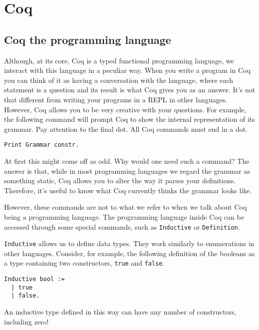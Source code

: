 \chapter{Coq}
\label{cap:coq-proof-assistant}

\section{Coq the programming language}
\label{sect:coq-programming-language}

Although, at its core, Coq is a typed functional programming language, we interact with this language
in a peculiar way. When you write a program in Coq you can think of it as having a conversation with the
language, where each statement is a question and its result is what Coq gives you as an answer. It's not
that different from writing your programs in a REPL in other languages. However, Coq  allows you to be
very creative with your questions. For example, the following command will prompt Coq to show the internal
representation of its grammar. Pay attention to the final dot. All Coq commands must end in a dot.

\begin{verbatim}
Print Grammar constr.
\end{verbatim}

At first this might come off as odd. Why would one need such a command? The answer is that, while in most
programming languages we regard the grammar as something static, Coq allows you to alter the way it parses
your definitions. Therefore, it's useful to know what Coq currently thinks the grammar looks like. 

However, these commands are not to what we refer to when we talk about Coq being a programming language.
The programming language inside Coq can be accessed through some special commands, such as 
\texttt{Inductive} or \texttt{Definition}.

\texttt{Inductive} allows us to define data types. They work similarly to enumerations in other
languages. Consider, for example, the following definition of the booleans as a type containing two 
constructors, \texttt{true} and \texttt{false}.

\begin{verbatim}
Inductive bool := 
  | true
  | false.
\end{verbatim}

An inductive type defined in this way can have any number of constructors, including zero!

